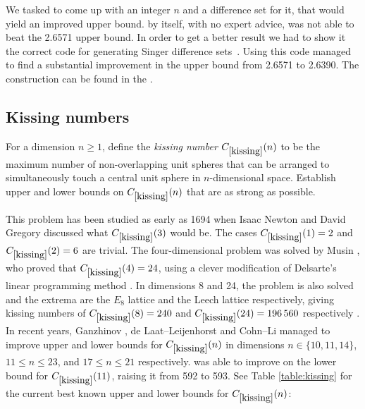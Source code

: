 We tasked \AlphaEvolve to come up with an integer $n$ and a difference set for it, that would yield an improved upper bound. \AlphaEvolve by itself, with no expert advice, was not able to beat the 2.6571 upper bound. In order to get a better result we had to show it the correct code for generating Singer difference sets~\cite{singer1938theorem}. Using this code \AlphaEvolve managed to find a substantial improvement in the upper bound from 2.6571 to 2.6390. The construction can be found in the \Repo.





\subsection{Kissing numbers}

\renewcommand{\problemURL}{https://google-deepmind.github.io/alphaevolve_repository_of_problems/problems/8.html}

\begin{problem}\label{kissing}  For a dimension $n \geq 1$, define the \emph{kissing number} $C_{\ref{kissing}}(n)$ to be the maximum number of non-overlapping unit spheres that can be arranged to simultaneously touch a central unit sphere  in $n$-dimensional space.  Establish upper and lower bounds on $C_{\ref{kissing}}(n)$ that are as strong as possible.
\end{problem}


This problem has been studied as early as 1694 when Isaac Newton and David Gregory discussed what $C_{\ref{kissing}}(3)$ would be. The cases $C_{\ref{kissing}}(1) = 2$ and $C_{\ref{kissing}}(2) = 6$ are trivial. The four-dimensional problem was solved by Musin \cite{musin}, who proved that $C_{\ref{kissing}}(4)=24$, using a clever modification of Delsarte's linear programming method \cite{delsarte}. In dimensions 8 and 24, the problem is also solved and the extrema are the $E_8$ lattice and the Leech lattice respectively, giving kissing numbers of $C_{\ref{kissing}}(8)=240$ and $C_{\ref{kissing}}(24) = \num{196560}$ respectively \cite{odlyzkosloane, levenshtein}. 
In recent years, Ganzhinov \cite{ganzhinov}, de Laat--Leijenhorst \cite{delaat} and Cohn--Li \cite{cohnli} managed to improve upper and lower bounds for $C_{\ref{kissing}}(n)$ in dimensions $n\in \{10, 11, 14\}$, $11 \leq n \leq 23$, and $17 \leq n \leq 21$ respectively. \AlphaEvolve was able to improve on the lower bound for $C_{\ref{kissing}}(11)$, raising it from 592 to 593. See Table \ref{table:kissing} for the current best known upper and lower bounds for $C_{\ref{kissing}}(n)$:


